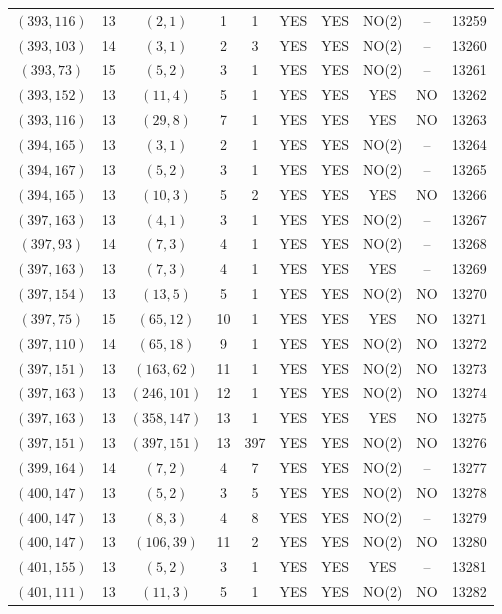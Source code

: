 \begin{longtable}{|c|c|c|c|c|c|c|c|c|c|}
$(393, 116)$ & 13 & $(2, 1)$ & 1 & 1 & YES & YES & NO(2) & -- & 13259\\
$(393, 103)$ & 14 & $(3, 1)$ & 2 & 3 & YES & YES & NO(2) & -- & 13260\\
$(393, 73)$ & 15 & $(5, 2)$ & 3 & 1 & YES & YES & NO(2) & -- & 13261\\
$(393, 152)$ & 13 & $(11, 4)$ & 5 & 1 & YES & YES & YES & NO & 13262\\
$(393, 116)$ & 13 & $(29, 8)$ & 7 & 1 & YES & YES & YES & NO & 13263\\
$(394, 165)$ & 13 & $(3, 1)$ & 2 & 1 & YES & YES & NO(2) & -- & 13264\\
$(394, 167)$ & 13 & $(5, 2)$ & 3 & 1 & YES & YES & NO(2) & -- & 13265\\
$(394, 165)$ & 13 & $(10, 3)$ & 5 & 2 & YES & YES & YES & NO & 13266\\
$(397, 163)$ & 13 & $(4, 1)$ & 3 & 1 & YES & YES & NO(2) & -- & 13267\\
$(397, 93)$ & 14 & $(7, 3)$ & 4 & 1 & YES & YES & NO(2) & -- & 13268\\
$(397, 163)$ & 13 & $(7, 3)$ & 4 & 1 & YES & YES & YES & -- & 13269\\
$(397, 154)$ & 13 & $(13, 5)$ & 5 & 1 & YES & YES & NO(2) & NO & 13270\\
$(397, 75)$ & 15 & $(65, 12)$ & 10 & 1 & YES & YES & YES & NO & 13271\\
$(397, 110)$ & 14 & $(65, 18)$ & 9 & 1 & YES & YES & NO(2) & NO & 13272\\
$(397, 151)$ & 13 & $(163, 62)$ & 11 & 1 & YES & YES & NO(2) & NO & 13273\\
$(397, 163)$ & 13 & $(246, 101)$ & 12 & 1 & YES & YES & NO(2) & NO & 13274\\
$(397, 163)$ & 13 & $(358, 147)$ & 13 & 1 & YES & YES & YES & NO & 13275\\
$(397, 151)$ & 13 & $(397, 151)$ & 13 & 397 & YES & YES & NO(2) & NO & 13276\\
$(399, 164)$ & 14 & $(7, 2)$ & 4 & 7 & YES & YES & NO(2) & -- & 13277\\
$(400, 147)$ & 13 & $(5, 2)$ & 3 & 5 & YES & YES & NO(2) & NO & 13278\\
$(400, 147)$ & 13 & $(8, 3)$ & 4 & 8 & YES & YES & NO(2) & -- & 13279\\
$(400, 147)$ & 13 & $(106, 39)$ & 11 & 2 & YES & YES & NO(2) & NO & 13280\\
$(401, 155)$ & 13 & $(5, 2)$ & 3 & 1 & YES & YES & YES & -- & 13281\\
$(401, 111)$ & 13 & $(11, 3)$ & 5 & 1 & YES & YES & NO(2) & NO & 13282\\

\end{longtable}
